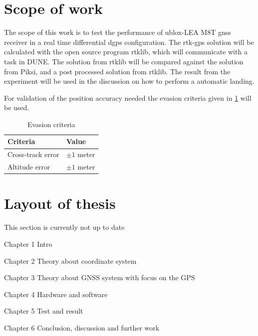 \section{Scope of work}
The scope of this work is to test the performance of ublox-LEA M8T \gls{gnss} receiver in a real time differential \gls{dgps} configuration. The \gls{rtk-gps} solution will be calculated with the open source program rtklib, which will communicate with a task in DUNE. The solution from rtklib will be compared against the solution from Piksi, and a post processed solution from rtklib. The result from the experiment will be used in the discussion on how to perform a automatic landing.

For validation of the position accuracy needed the evasion criteria given in \ref{Tb:Evasion} \citep{Froelich} will be used.
\begin{table}[!h]
\begin{center}
    \begin{tabular}{ | l | l |}
    \hline
    \textbf{Criteria} & \textbf{Value} \\ \hline
     Cross-track error & $\pm1$ meter  \\ \hline
     Altitude error & $\pm1$ meter \\ \hline
    \end{tabular}
\end{center}
\caption{Evasion criteria }
\label{Tb:Evasion}
\end{table}

\section{Layout of thesis}
This section is currently not up to date

Chapter 1 Intro

Chapter 2 Theory about coordinate system

Chapter 3 Theory about GNSS system with focus on the GPS

Chapter 4 Hardware and software

Chapter 5 Test and result

Chapter 6 Conclusion, discussion and further work


